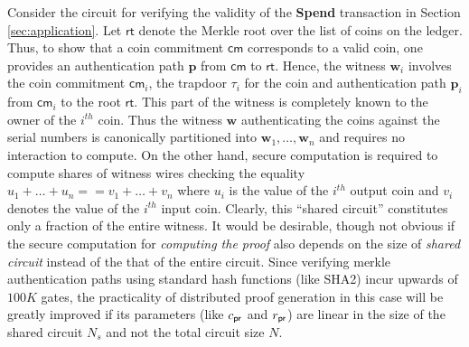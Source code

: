 Consider the circuit for verifying the validity of the {\bf Spend} transaction in Section \ref{sec:application}. 
Let $\mathsf{rt}$ denote the Merkle root over the list of coins on the ledger. Thus, to show that a coin 
commitment $\mathsf{cm}$ corresponds to a valid coin, one provides an authentication path $\bm{p}$ from 
$\mathsf{cm}$ to $\mathsf{rt}$. Hence, the witness $\bm{w}_i$ involves the coin commitment $\mathsf{cm}_i$, the trapdoor $\tau_i$ for the coin and authentication path $\bm{p}_i$ from $\mathsf{cm}_i$ to the root $\mathsf{rt}$. This part of the witness is completely known to the owner of the $i^{th}$ coin. Thus the witness $\bm{w}$ authenticating the coins against the serial numbers is canonically partitioned into $\bm{w}_1,\ldots,\bm{w}_n$
and requires no interaction to compute. On the other hand, secure computation is required to compute shares of witness wires 
checking the equality $u_1+\ldots+u_n == v_1+\ldots+v_n$ where $u_i$ is the value of the $i^{th}$ output coin and $v_i$ 
denotes the value of the $i^{th}$ input coin. Clearly, this ``shared circuit'' 
constitutes only a fraction of the entire witness. It would be desirable, though not obvious if the secure computation for {\em computing the proof} 
also depends on the size of {\em shared circuit} instead of the that of the entire circuit. 
Since verifying merkle authentication paths using 
standard hash functions (like SHA2) incur upwards of $100K$ gates, the practicality of distributed proof generation in this case will be
greatly improved if its parameters (like $c_\mathsf{pr}$ and $r_\mathsf{pr}$) are 
linear in the size of the shared circuit $N_s$ and not the total circuit size $N$.
